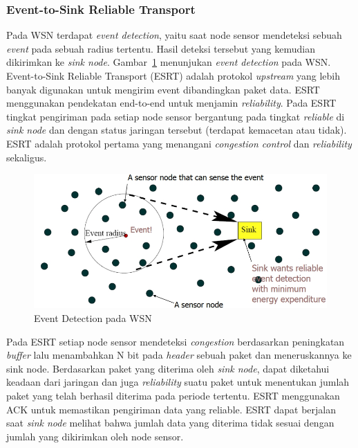 \subsubsection{Event-to-Sink Reliable Transport}
Pada WSN terdapat \textit{event detection}, yaitu saat node sensor mendeteksi sebuah \textit{event} pada sebuah radius tertentu. Hasil deteksi tersebut yang kemudian dikirimkan ke \textit{sink node}. Gambar~\ref{fig:event_detection} menunjukan \textit{event detection} pada WSN. Event-to-Sink Reliable Transport (ESRT) adalah protokol \textit{upstream} yang lebih banyak digunakan untuk mengirim event dibandingkan paket data. ESRT menggunakan pendekatan end-to-end untuk menjamin \textit{reliability}. Pada ESRT tingkat pengiriman pada setiap node sensor bergantung pada tingkat \textit{reliable} di \textit{sink node} dan dengan status jaringan tersebut (terdapat kemacetan atau tidak). ESRT adalah protokol pertama yang menangani \textit{congestion control} dan \textit{reliability} sekaligus. 

\begin{figure} [H]
	\centering  
	\includegraphics[scale=0.6]{Gambar/event_detection}  
	\caption[Event Detection pada WSN]{Event Detection pada WSN} 
	\label{fig:event_detection} 
\end{figure}

Pada ESRT setiap node sensor mendeteksi \textit{congestion} berdasarkan peningkatan \textit{buffer} lalu menambahkan N bit pada \textit{header} sebuah paket dan meneruskannya ke sink node. Berdasarkan paket yang diterima oleh \textit{sink node}, dapat diketahui keadaan dari jaringan dan juga \textit{reliability} suatu paket untuk menentukan jumlah paket yang telah berhasil diterima pada periode tertentu. ESRT menggunakan ACK untuk memastikan pengiriman data yang reliable. ESRT dapat berjalan saat \textit{sink node} melihat bahwa jumlah data yang diterima tidak sesuai dengan jumlah yang dikirimkan oleh node sensor.

